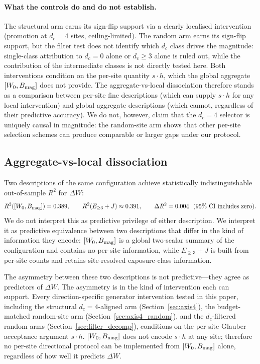 \documentclass[aps,pre,preprint,superscriptaddress,showpacs]{revtex4-2}
\begin{document}
\paragraph{What the controls do and do not establish.}
The structural arm earns its sign-flip support \AxisBSignFlips{} via a
clearly localised intervention (promotion at $d_c=4$ sites,
ceiling-limited).
The random arm earns its sign-flip support, but the filter test does
not identify which $d_c$ class drives the magnitude: single-class
attribution to $d_c=0$ alone or $d_c\geq 3$ alone is ruled out, while
the contribution of the intermediate classes is not directly tested
here.
Both interventions condition on the per-site quantity $s\cdot h$, which
the global aggregate $[W_0, B_{\rm mag}]$ does not provide.
The aggregate-vs-local dissociation therefore stands as a comparison
between per-site fine descriptions (which can supply $s\cdot h$ for any
local intervention) and global aggregate descriptions (which cannot,
regardless of their predictive accuracy).
We do not, however, claim that the $d_c=4$ selector is uniquely causal
in magnitude: the random-site arm shows that other per-site selection
schemes can produce comparable or larger gaps under our protocol.

\subsection{Aggregate-vs-local dissociation}
\label{sec:diss}

Two descriptions of the same configuration achieve statistically
indistinguishable out-of-sample $R^2$ for $\Delta W$:
\begin{equation}
R^2([W_0, B_\mathrm{mag}]) = 0.389,\qquad
R^2(E_{\geq 3}+J) \approx 0.391,\qquad
\Delta R^2 = 0.004 \ \ \text{(95\% CI includes zero)}.
\end{equation}
We do not interpret this as predictive privilege of either
description.
We interpret it as predictive equivalence between two descriptions
that differ in the kind of information they encode:
$[W_0, B_{\rm mag}]$ is a global two-scalar summary of the
configuration and contains no per-site information, while
$E_{\geq 3}+J$ is built from per-site counts and retains site-resolved
exposure-class information.

The asymmetry between these two descriptions is not predictive---they
agree as predictors of $\Delta W$.
The asymmetry is in the kind of intervention each can support.
Every direction-specific generator intervention tested in this paper,
including the structural $d_c=4$-aligned arm
(Section~\ref{sec:axis4}), the budget-matched random-site arm
(Section~\ref{sec:axis4_random}), and the $d_c$-filtered random arms
(Section~\ref{sec:filter_decomp}), conditions on the per-site Glauber
acceptance argument $s\cdot h$.
$[W_0, B_{\rm mag}]$ does not encode $s\cdot h$ at any site; therefore
no per-site directional protocol can be implemented from
$[W_0, B_{\rm mag}]$ alone, regardless of how well it predicts
$\Delta W$.
\end{document}
